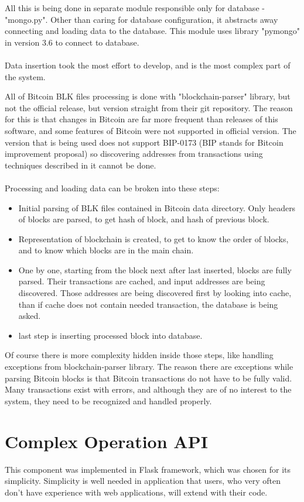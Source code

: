 \documentclass[12pt, en, eng, oneside]{mgr}
\begin{document}
All this is being done in separate module responsible only for database - "mongo.py". Other than caring for database configuration, it abstracts away connecting and loading data to the database. This module uses library "pymongo" in version 3.6 to connect to database.
\\
\\  
Data insertion took the most effort to develop, and is the most complex part of the system.

All of Bitcoin BLK files processing is done with "blockchain-parser" library, but not the official release, but version straight from their git repository. The reason for this is that changes in Bitcoin are far more frequent than releases of this software, and some features of Bitcoin were not supported in official version. The version that is being used does not support BIP-0173 (BIP stands for Bitcoin improvement proposal) so discovering addresses from transactions using techniques described in it cannot be done. 
\\
\\
Processing and loading data can be broken into these steps:
\begin{itemize}
\item
Initial parsing of BLK files contained in Bitcoin data directory. Only headers of blocks are parsed, to get hash of block, and hash of previous block.
\item
Representation of blockchain is created, to get to know the order of blocks, and to know which blocks are in the main chain.
\item
One by one, starting from the block next after last inserted, blocks are fully parsed. Their transactions are cached, and input addresses are being discovered. Those addresses are being discovered first by looking into cache, than if cache does not contain needed transaction, the database is being asked.
\item
last step is inserting processed block into database.
\end{itemize}

Of course there is more complexity hidden inside those steps, like handling exceptions from blockchain-parser library. The reason there are exceptions while parsing Bitcoin blocks is that Bitcoin transactions do not have to be fully valid. Many transactions exist with errors, and although they are of no interest to the system, they need to be recognized and handled properly.

\section{Complex Operation API}
This component was implemented in Flask framework, which was chosen for its simplicity. Simplicity is well needed in application that users, who very often don't have experience with web applications, will extend with their code. 
\end{document}
